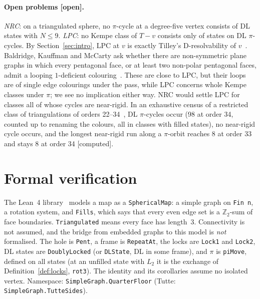 \documentclass[11pt]{article}
\theoremstyle{definition}
\newcommand{\lab}[1]{\textsf{[#1]}}
\newcommand{\lean}[1]{\texttt{#1}}
\newcommand{\Z}{\mathbb Z}
\begin{document}
\paragraph{Open problems \lab{open}.} \emph{NRC}: on a triangulated sphere, no $\pi$-cycle at a degree-five vertex consists of DL states with $N\le9$. \emph{LPC}: no Kempe class of $T-v$ consists only of states on DL $\pi$-cycles. By Section~\ref{sec:intro}, LPC at $v$ is exactly Tilley's D-resolvability of $v$~\cite{tilley2017}. Baldridge, Kauffman and McCarty ask whether there are non-symmetric plane graphs in which every pentagonal face, or at least two non-polar pentagonal faces, admit a looping $1$-deficient colouring~\cite[Questions~5.1--5.2]{bkm2026}. These are close to LPC, but their loops are of single edge colourings under the pass, while LPC concerns whole Kempe classes under $\pi$; we see no implication either way. NRC would settle LPC for classes all of whose cycles are near-rigid. In an exhaustive census of a restricted class of triangulations of orders 22--34~\cite{vhe2026,record}, DL $\pi$-cycles occur (98 at order 34, counted up to renaming the colours, all in classes with filled states), no near-rigid cycle occurs, and the longest near-rigid run along a $\pi$-orbit reaches 8 at order 33 and stays 8 at order 34 \lab{computed}.

\section{Formal verification}\label{sec:lean}
The Lean~4 library~\cite{planemap} models a map as a \lean{SphericalMap}: a simple graph on \lean{Fin n}, a rotation system, and \lean{Fills}, which says that every even edge set is a $\Z_2$-sum of face boundaries. \lean{Triangulated} means every face has length~3. Connectivity is not assumed, and the bridge from embedded graphs to this model is \emph{not} formalised. The hole is \lean{Pent}, a frame is \lean{RepeatAt}, the locks are \lean{Lock1} and \lean{Lock2}, DL states are \lean{DoublyLocked} (or \lean{DLState}, DL in some frame), and $\pi$ is \lean{piMove}, defined on all states (at an unfilled state with $L_2$ it is the exchange of Definition~\ref{def:locks}, \lean{rot3}). The identity and its corollaries assume no isolated vertex. Namespace: \lean{SimpleGraph.QuarterFloor} (Tutte: \lean{SimpleGraph.TutteSides}).
\end{document}
